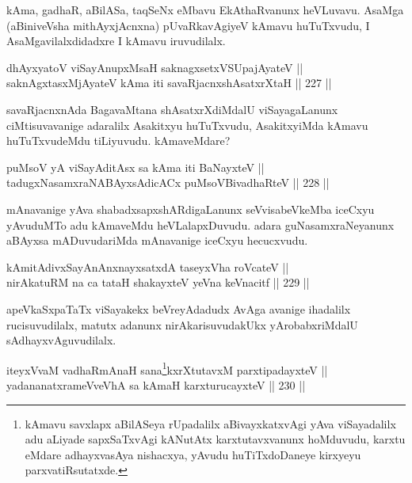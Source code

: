\begin{artha}
kAma, gadhaR, aBilASa, taqSeNx eMbavu EkAthaRvanunx
heVLuvavu. AsaMga (aBiniveVsha mithAyxjAcnxna) pUvaRkavAgiyeV kAmavu
huTuTxvudu, I AsaMgavilalxdidadxre I kAmavu iruvudilalx.
\end{artha}


\begin{shl}
dhAyxyatoV viSayAnupxMsaH saknagxsetxVSUpajAyateV || \\
saknAgxtasxMjAyateV kAma iti savaRjacnxshAsatxrXtaH \hfill || 227 ||  
\end{shl}

\begin{artha}
savaRjacnxnAda BagavaMtana shAsatxrXdiMdalU viSayagaLanunx
ciMtisuvavanige adaralilx Asakitxyu huTuTxvudu, AsakitxyiMda kAmavu
huTuTxvudeMdu tiLiyuvudu. kAmaveMdare?
\end{artha}

\begin{shl}
puMsoV yA viSayAditAsx sa kAma iti BaNayxteV || \\
tadugxNasamxraNABAyxsAdicACx puMsoV\s BivadhaRteV \hfill || 228 ||  
\end{shl}

\begin{artha}
mAnavanige yAva shabadxsapxshARdigaLanunx seVvisabeVkeMba iceCxyu
yAvuduMTo adu kAmaveMdu heVLalapxDuvudu. adara guNasamxraNeyanunx
aBAyxsa mADuvudariMda mAnavanige iceCxyu hecucxvudu.
\end{artha}

\begin{shl}
kAmitAdivxSayAnAnxnayxsatxdA taseyxVha roVcateV || \\
nirAkatuRM na ca tataH shakayxteV yeVna keVnacitf \hfill || 229 ||  
\end{shl}

\begin{artha}
apeVkaSxpaTaTx viSayakekx beVreyAdadudx AvAga avanige ihadalilx
rucisuvudilalx, matutx adanunx nirAkarisuvudakUkx yArobabxriMdalU
sAdhayxvAguvudilalx.
\end{artha}


\begin{shl}
iteyxVvaM vadhaRmAnaH sana\footnote{kAmavu savxlapx aBilASeya rUpadalilx aBivayxkatxvAgi yAva
viSayadalilx adu aLiyade sapxSaTxvAgi kANutAtx karxtutavxvanunx
hoMduvudu, karxtu eMdare adhayxvasAya nishacxya, yAvudu
huTiTxdoDaneye kirxyeyu parxvatiRsutatxde.}kxrXtutavxM parxtipadayxteV || \\
yadananatxrameVveVhA sa kAmaH karxturucayxteV \hfill || 230 ||  
\end{shl}

